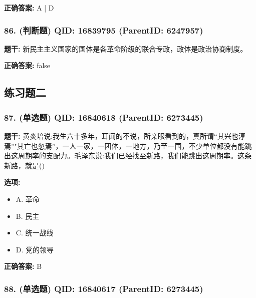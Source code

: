 \documentclass[12pt,UTF8]{ctexart}
\begin{document}
\textbf{正确答案:}
A | D

\vspace{0.3em}\hrulefill\vspace{0.7em}

\subsubsection*{86. (判断题) \small QID: 16839795 (ParentID: 6247957)}

\textbf{题干:}
新民主主义国家的国体是各革命阶级的联合专政，政体是政治协商制度。



\textbf{正确答案:}
false

\vspace{0.3em}\hrulefill\vspace{0.7em}

\subsection*{练习题二}

\subsubsection*{87. (单选题) \small QID: 16840618 (ParentID: 6273445)}

\textbf{题干:}
黄炎培说:我生六十多年，耳闻的不说，所亲眼看到的，真所谓“其兴也淳焉”"其亡也忽焉”，一人一家，一团体，一地方，乃至一国，不少单位都没有能跳出这周期率的支配力。毛泽东说:我们已经找至新路，我们能跳出这周期率。这条新路，就是()



\textbf{选项:}
\begin{itemize}[leftmargin=*]

  \item A. 革命

  \item B. 民主

  \item C. 统一战线

  \item D. 党的领导

\end{itemize}

\textbf{正确答案:}
B

\vspace{0.3em}\hrulefill\vspace{0.7em}

\subsubsection*{88. (单选题) \small QID: 16840617 (ParentID: 6273445)}
\end{document}
